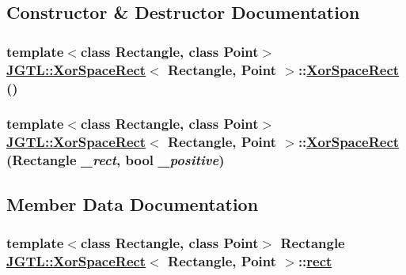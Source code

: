 \subsection{Constructor \& Destructor Documentation}
\hypertarget{class_j_g_t_l_1_1_xor_space_rect_aeeac5078979658fb7234c36c7faab90}{
\subsubsection[XorSpaceRect]{\setlength{\rightskip}{0pt plus 5cm}template$<$class Rectangle, class Point$>$ \hyperlink{class_j_g_t_l_1_1_xor_space_rect}{JGTL::Xor\-Space\-Rect}$<$ Rectangle, Point $>$::\hyperlink{class_j_g_t_l_1_1_xor_space_rect}{Xor\-Space\-Rect} ()}}
\label{class_j_g_t_l_1_1_xor_space_rect_aeeac5078979658fb7234c36c7faab90}


\hypertarget{class_j_g_t_l_1_1_xor_space_rect_7e23ca980e665ef6bea0e1f8052a2628}{
\subsubsection[XorSpaceRect]{\setlength{\rightskip}{0pt plus 5cm}template$<$class Rectangle, class Point$>$ \hyperlink{class_j_g_t_l_1_1_xor_space_rect}{JGTL::Xor\-Space\-Rect}$<$ Rectangle, Point $>$::\hyperlink{class_j_g_t_l_1_1_xor_space_rect}{Xor\-Space\-Rect} (Rectangle {\em \_\-rect}, bool {\em \_\-positive})}}
\label{class_j_g_t_l_1_1_xor_space_rect_7e23ca980e665ef6bea0e1f8052a2628}




\subsection{Member Data Documentation}
\hypertarget{class_j_g_t_l_1_1_xor_space_rect_5cb60d58273133694cc1f0c821471603}{
\subsubsection[rect]{\setlength{\rightskip}{0pt plus 5cm}template$<$class Rectangle, class Point$>$ Rectangle \hyperlink{class_j_g_t_l_1_1_xor_space_rect}{JGTL::Xor\-Space\-Rect}$<$ Rectangle, Point $>$::\hyperlink{class_j_g_t_l_1_1_xor_space_rect_5cb60d58273133694cc1f0c821471603}{rect}}}
\label{class_j_g_t_l_1_1_xor_space_rect_5cb60d58273133694cc1f0c821471603}



